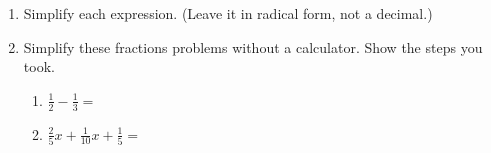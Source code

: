 \documentclass[12pt, twoside]{article}
\begin{document}
\begin{enumerate}
\subsubsection*{Early finishers \hfill [4]}
\item Simplify each expression. (Leave it in radical form, not a decimal.)
\begin{enumerate}
\end{enumerate}
\vspace{2cm}

\item Simplify these fractions problems without a calculator. Show the steps you took.
  \begin{multicols}{2}
    \begin{enumerate}
      \item   $\displaystyle \frac{1}{2} - \frac{1}{3}=$ \vspace{6cm}
      \item   $\displaystyle \frac{2}{5}x+\frac{1}{10}x+\frac{1}{5}=$  \vspace{6cm}
    \end{enumerate}
  \end{multicols}

\end{enumerate}
\end{document}
